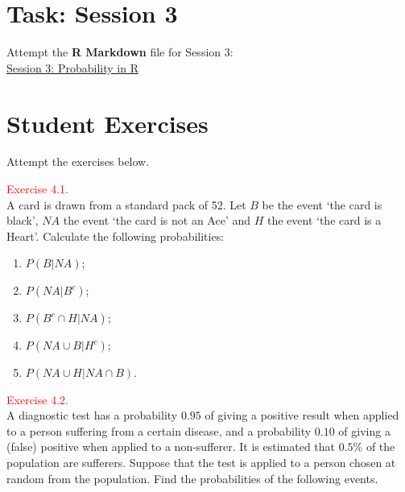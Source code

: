 \documentclass[
]{book}
\providecommand{\tightlist}{%
  \setlength{\itemsep}{0pt}\setlength{\parskip}{0pt}}
\begin{document}
\hfill\break

\hypertarget{rv:lab}{%
\section*{\texorpdfstring{{\textbf{Task: Session 3}}}{Task: Session 3}}\label{rv:lab}}

Attempt the \textbf{R Markdown} file for Session 3:\\
\href{https://moodle.nottingham.ac.uk/course/view.php?id=134982\#section-2}{Session 3: Probability in R}

\hypertarget{prob:stud}{%
\section*{\texorpdfstring{{\textbf{Student Exercises}}}{Student Exercises}}\label{prob:stud}}

Attempt the exercises below.

\leavevmode{}%
\textcolor{red}{Exercise 4.1.}\\
A card is drawn from a standard pack of 52. Let \(B\) be the event `the card is black', \(NA\) the event `the card is not an Ace' and \(H\) the event `the card is a Heart'. Calculate the following probabilities:

\begin{enumerate}
\def\labelenumi{(\alph{enumi})}
\tightlist
\item
  \(P(B|NA)\);\\
\item
  \(P(NA|B^c)\);\\
\item
  \(P(B^c \cap H | NA)\);\\
\item
  \(P(NA \cup B | H^c)\);\\
\item
  \(P(NA \cup H | NA \cap B)\).\\
\end{enumerate}

\leavevmode{}%
\textcolor{red}{Exercise 4.2.}\\
A diagnostic test has a probability \(0.95\) of giving a positive result when
applied to a person suffering from a certain disease, and a probability \(0.10\) of giving
a (false) positive when applied to a non-sufferer. It is estimated that \(0.5\%\) of the population
are sufferers. Suppose that the test is applied to a person chosen at random from
the population. Find the probabilities of the following events.
\end{document}
